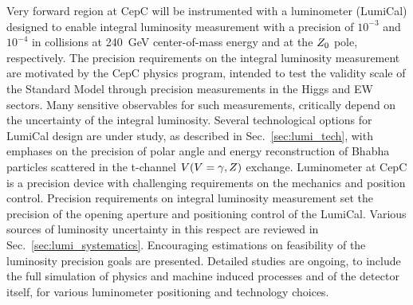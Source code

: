 Very forward region at CepC will be instrumented with a luminometer (LumiCal) designed to enable integral luminosity measurement with a precision of $10^{-3}$ and $10^{-4}$ in \epem collisions at 240~GeV center-of-mass energy and at the $Z_0$ pole, respectively. The precision requirements on the integral luminosity measurement are motivated by the CepC physics program, intended to test the validity scale of the Standard Model through precision measurements in the Higgs and EW sectors.  Many sensitive observables for such measurements, critically depend on the uncertainty of the integral luminosity.
Several technological options for LumiCal design are under study, as described in Sec.\ \ref{sec:lumi_tech}, with emphases on the precision of polar angle and energy reconstruction of Bhabha particles scattered in the t-channel $V (V=\gamma, Z)$ exchange.
Luminometer at CepC is a precision device with challenging requirements on the mechanics and position control. Precision requirements on integral luminosity measurement set the precision of the opening aperture and positioning control of the LumiCal. Various sources of luminosity uncertainty in this respect are reviewed in Sec.\ \ref{sec:lumi_systematics}.
Encouraging estimations on feasibility of the luminosity precision goals are presented. Detailed studies are ongoing, to include the full simulation of physics and machine induced processes and of the detector itself, for various luminometer positioning and technology choices.
